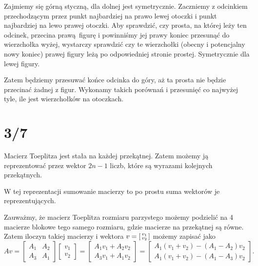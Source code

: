 \documentclass[a4paper, 12pt]{article}
\newcommand{\+}{\enspace}
\begin{document}
Zajmiemy się górną styczną, dla dolnej jest symetrycznie.
Zaczniemy z odcinkiem przechodzącym przez punkt najbardziej na prawo lewej otoczki
i punkt najbardziej na lewo prawej otoczki.
Aby sprawdzić, czy prosta, na której leży ten odcinek, przecina prawą figurę
i powinniśmy jej prawy koniec przesunąć do wierzchołka wyżej, wystarczy
sprawdzić czy te wierzchołki (obecny i potencjalny nowy koniec) prawej figury
leżą po odpowiedniej stronie prostej.
Symetrycznie dla lewej figury.

Zatem będziemy przesuwać końce odcinka do góry, aż ta prosta nie będzie przecinać
żadnej z figur.
Wykonamy takich porównań i przesunięć co najwyżej tyle, ile jest wierzchołków
na otoczkach.


\section*{3/7}
Macierz Toeplitza jest stała na każdej przekątnej.
Zatem możemy ją reprezentować przez wektor $2n-1$ liczb, które
są wyrazami kolejnych przekątnych.

W tej reprezentacji sumowanie macierzy to po prostu suma wektorów je
reprezentujących.

Zauważmy, że macierz Toeplitza rozmiaru parzystego możemy podzielić
na 4 macierze blokowe tego samego rozmiaru, gdzie macierze na przekątnej są równe.
Zatem iloczyn takiej macierzy i wektora $v = \begin{bsmallmatrix}v_1 \\ v_2\end{bsmallmatrix}$
możemy zapisać jako
$$Av
= \begin{bmatrix}A_1 & A_2 \\ A_3 & A_1\end{bmatrix}\begin{bmatrix}v_1 \\ v_2\end{bmatrix}
= \begin{bmatrix}A_1v_1 + A_2v_2 \\ A_3v_1 + A_1v_2\end{bmatrix}
= \begin{bmatrix}A_1(v_1 + v_2) - (A_1 - A_2)v_2 \\ A_1(v_1 + v_2) - (A_1 - A_3) v_2\end{bmatrix}.$$
\end{document}
